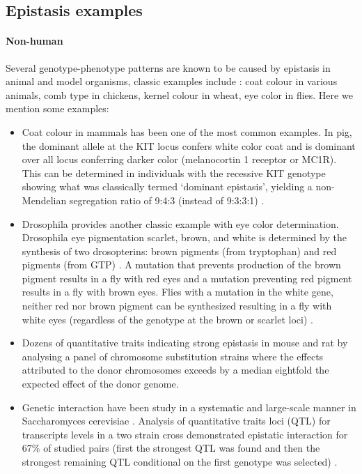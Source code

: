 \subsection{Epistasis examples}

\paragraph{Non-human}
Several genotype-phenotype patterns are known to be caused by epistasis in animal and model organisms, classic examples include \cite{carlborg2004epistasis}:
coat colour in various animals, 
comb type in chickens, 
kernel colour in wheat,
eye color in flies. 
Here we mention some examples:

\begin{itemize}

	\item Coat colour in mammals has been one of the most common examples. 
In pig, the dominant allele at the KIT locus confers white color coat and is dominant over all locus conferring darker color (melanocortin 1 receptor or MC1R). 
This can be determined in individuals with the recessive KIT genotype showing what was classically termed `dominant epistasis', 
yielding a non-Mendelian segregation ratio of 9:4:3 (instead of 9:3:3:1) \cite{carlborg2004epistasis, phillips2008epistasis}.

	\item Drosophila provides another classic example with eye color determination.
Drosophila eye pigmentation scarlet, brown, and white is determined by the synthesis of two drosopterins:  brown pigments (from tryptophan) and red pigments (from GTP) \cite{tyler2009shadows}.
A mutation that prevents production of the brown pigment results in a fly with red eyes and a mutation preventing red pigment results in a fly with brown eyes.
Flies with a mutation in the white gene, neither red nor brown pigment can be synthesized resulting in a fly with white eyes (regardless of the genotype at the brown or scarlet loci) \cite{tyler2009shadows}.

	\item Dozens of quantitative traits indicating strong epistasis in mouse and rat \cite{shao2008genetic} by analysing a panel of chromosome substitution strains where the effects attributed to the donor chromosomes exceeds by a median eightfold the expected effect of the donor genome.

	\item Genetic interaction have been study in a systematic and large-scale manner in Saccharomyces cerevisiae \cite{jasnos2007epistatic,tong2001systematic}.
Analysis of quantitative traits loci (QTL) for transcripts levels in a two strain cross demonstrated epistatic interaction for $67\%$ of studied pairs (first the strongest QTL was found and then the strongest remaining QTL conditional on the first genotype was selected) \cite{brem2005genetic}. 


\end{itemize}
